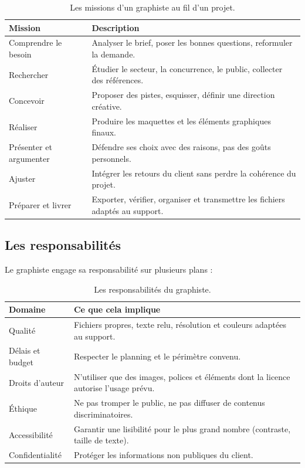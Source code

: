 \begin{table}[h!]
\centering
\begin{tabular}{@{}p{3.6cm}p{10.4cm}@{}}
\toprule
\textbf{Mission} & \textbf{Description} \\
\midrule
Comprendre le besoin & Analyser le brief, poser les bonnes questions, reformuler la demande. \\
Rechercher & Étudier le secteur, la concurrence, le public, collecter des références. \\
Concevoir & Proposer des pistes, esquisser, définir une direction créative. \\
Réaliser & Produire les maquettes et les éléments graphiques finaux. \\
Présenter et argumenter & Défendre ses choix avec des raisons, pas des goûts personnels. \\
Ajuster & Intégrer les retours du client sans perdre la cohérence du projet. \\
Préparer et livrer & Exporter, vérifier, organiser et transmettre les fichiers adaptés au support. \\
\bottomrule
\end{tabular}
\caption{Les missions d'un graphiste au fil d'un projet.}
\end{table}

\subsection{Les responsabilités}

Le graphiste engage sa responsabilité sur plusieurs plans :

\begin{table}[h!]
\centering
\begin{tabular}{@{}p{3.6cm}p{10.4cm}@{}}
\toprule
\textbf{Domaine} & \textbf{Ce que cela implique} \\
\midrule
Qualité & Fichiers propres, texte relu, résolution et couleurs adaptées au support. \\
Délais et budget & Respecter le planning et le périmètre convenu. \\
Droits d'auteur & N'utiliser que des images, polices et éléments dont la licence autorise l'usage prévu. \\
Éthique & Ne pas tromper le public, ne pas diffuser de contenus discriminatoires. \\
Accessibilité & Garantir une lisibilité pour le plus grand nombre (contraste, taille de texte). \\
Confidentialité & Protéger les informations non publiques du client. \\
\bottomrule
\end{tabular}
\caption{Les responsabilités du graphiste.}
\end{table}

